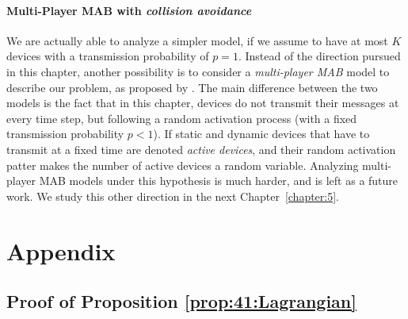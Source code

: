 \paragraph{Multi-Player MAB with \emph{collision avoidance}}

We are actually able to analyze a simpler model, if we assume to have at most $K$ devices with a transmission probability of $p=1$.
Instead of the direction pursued in this chapter, another possibility is to consider a \emph{multi-player MAB} model to describe our problem, as proposed by \cite{Zhao10}.
%
The main difference between the two models is the fact that in this chapter, devices do not transmit their messages at every time step, but following a random activation process (with a fixed transmission probability $p < 1$).
If static and dynamic devices that have to transmit at a fixed time are denoted \emph{active devices},
and their random activation patter makes the number of active devices a random variable.
Analyzing multi-player MAB models under this hypothesis is much harder, and is left as a future work.
%
We study this other direction in the next Chapter~\ref{chapter:5}.


\newpage
\section{Appendix}
\label{sec:4:appendix}

\subsection{Proof of Proposition \ref{prop:41:Lagrangian}}
\label{sec:4:proofLagrangian}

